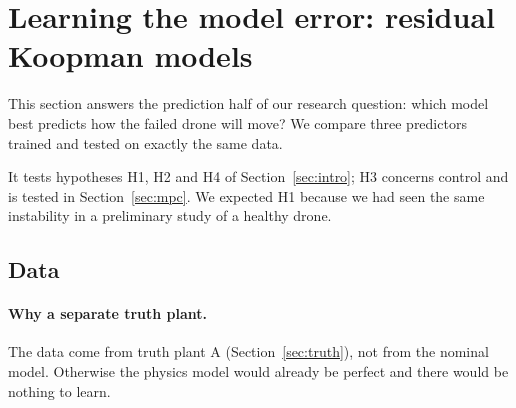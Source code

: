 \section{Learning the model error: residual Koopman models}\label{sec:koopman}
This section answers the prediction half of our research question: which model best predicts how the failed drone will move? We compare three predictors trained and tested on exactly the same data.

It tests hypotheses H1, H2 and H4 of Section~\ref{sec:intro}; H3 concerns control and is tested in Section~\ref{sec:mpc}. We expected H1 because we had seen the same instability in a preliminary study of a healthy drone.

\subsection{Data}
\paragraph{Why a separate truth plant.} The data come from truth plant A (Section~\ref{sec:truth}), not from the nominal model. Otherwise the physics model would already be perfect and there would be nothing to learn.

